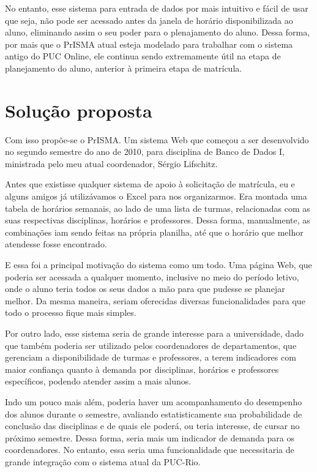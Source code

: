\documentclass[graduacao,brazil]{ThesisPUC}
\begin{document}
No entanto, esse sistema para entrada de dados por mais intuitivo e fácil de usar que seja, não pode ser acessado antes da janela de horário disponibilizada ao aluno, eliminando assim o seu poder para o plenajamento do aluno. Dessa forma, por mais que o PrISMA atual esteja modelado para trabalhar com o sistema antigo do PUC Online, ele continua sendo extremamente útil na etapa de planejamento do aluno, anterior à primeira etapa de matrícula.



\chapter{Solução proposta}

Com isso propõe-se o PrISMA. Um sistema Web que começou a ser desenvolvido no segundo semestre do ano de 2010, para disciplina de Banco de Dados I, ministrada pelo meu atual coordenador, Sérgio Lifschitz.

Antes que existisse qualquer sistema de apoio à solicitação de matrícula, eu e alguns amigos já utilizávamos o Excel para nos organizarmos. Era montada uma tabela de horários semanais, ao lado de uma lista de turmas, relacionadas com as suas respectivas disciplinas, horários e professores. Dessa forma, manualmente, as combinações iam sendo feitas na própria planilha, até que o horário que melhor atendesse fosse encontrado.

E essa foi a principal motivação do sistema como um todo. Uma página Web, que poderia ser acessada a qualquer momento, inclusive no meio do período letivo, onde o aluno teria todos os seus dados a mão para que pudesse se planejar melhor. Da mesma maneira, seriam oferecidas diversas funcionalidades para que todo o processo fique mais simples.

Por outro lado, esse sistema seria de grande interesse para a universidade, dado que também poderia ser utilizado pelos coordenadores de departamentos, que gerenciam a disponibilidade de turmas e professores, a terem indicadores com maior confiança quanto à demanda por disciplinas, horários e professores específicos, podendo atender assim a mais alunos.

Indo um pouco mais além, poderia haver um acompanhamento do desempenho dos alunos durante o semestre, avaliando estatisticamente sua probabilidade de conclusão das disciplinas e de quais ele poderá, ou teria interesse, de cursar no próximo semestre. Dessa forma, seria mais um indicador de demanda para os coordenadores. No entanto, essa seria uma funcionalidade que necessitaria de grande integração com o sistema atual da PUC-Rio.
\end{document}
